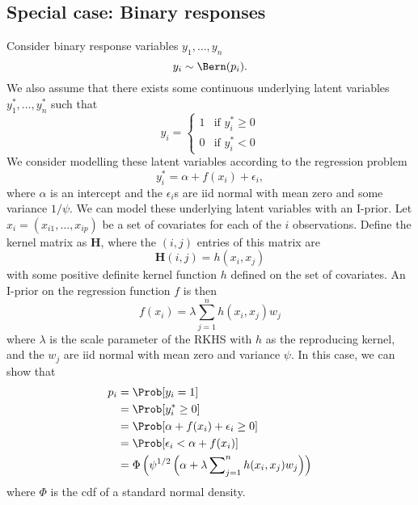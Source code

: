 

\subsection{Special case: Binary responses}

Consider binary response variables $y_1, \dots, y_n$
\[
  y_i \sim \Bern(p_i).
\]
We also assume that there exists some continuous underlying latent variables $y_1^*, \dots, y_n^*$ such that
\[
  y_i =
  \begin{cases}
    1 &\text{if } y_i^* \geq 0 \\
    0 &\text{if } y_i^* < 0
  \end{cases}
\]
We consider modelling these latent variables according to the regression problem
\[
  y_i^* = \alpha + f(x_i) + \epsilon_i,
\]
where $\alpha$ is an intercept and the $\epsilon_i$s are iid normal with mean zero and some variance $1/\psi$. We can model these underlying latent variables with an I-prior. Let $x_i = (x_{i1}, \dots, x_{ip})$ be a set of covariates for each of the $i$ observations. Define the kernel matrix as $\mathbf H$, where the $(i,j)$ entries of this matrix are
\[
  \mathbf H(i,j) = h(x_i, x_j)
\]
with some positive definite kernel function $h$ defined on the set of covariates. An I-prior on the regression function $f$ is then 
\[
  f(x_i) = \lambda \sum_{j=1}^n h(x_i, x_j) w_j
\]
where $\lambda$ is the scale parameter of the RKHS with $h$ as the reproducing kernel, and the $w_j$ are iid normal with mean zero and variance $\psi$. In this case, we can show that
\begin{align*}
  p_i &= \Prob[y_i = 1] \\
  &= \Prob[y_i^* \geq 0] \\
  &= \Prob[\alpha + f(x_i) + \epsilon_i \geq 0 ] \\
  &= \Prob[\epsilon_i < \alpha + f(x_i)] \\
  &= \Phi\left(\psi^{1/2} \left(  \alpha + \lambda \sum\nolimits_{j=1}^n h(x_i, x_j) w_j \right) \right)
\end{align*}
where $\Phi$ is the cdf of a standard normal density.

